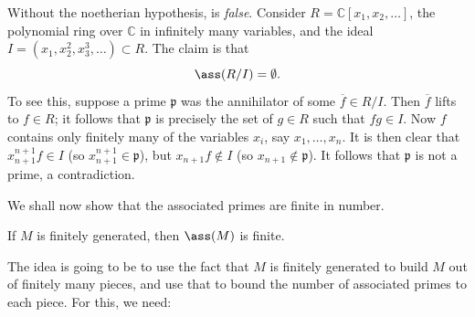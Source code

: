 \begin{example}
Without the noetherian hypothesis,  is
\emph{false}. Consider $R = \mathbb{C}[x_1, x_2, \dots]$, the polynomial ring
over $\mathbb{C}$ in infinitely many variables, and the ideal $I = (x_1,
x_2^2, x_3^3, \dots) \subset R$.
The claim is that 
\[ \ass(R/I ) = \emptyset.  \]
To see this, suppose a prime $\mathfrak{p}$ was the annihilator of some
$\overline{f}\in R/I$.  Then $\overline{f}$ lifts to $f \in R$; it follows
that $\mathfrak{p}$ is precisely the set of $g \in R$ such that $fg \in I$.
Now $f$ contains only finitely many of the variables $x_i$, say $x_1, \dots,
x_n$. It is then clear that $x_{n+1}^{n+1} f \in I$  (so $x_{n+1}^{n+1} \in
\mathfrak{p}$), but $x_{n+1} f \notin I$ (so $x_{n+1} \notin \mathfrak{p}$).
It follows that $\mathfrak{p}$ is not a prime, a contradiction.
\end{example} 

We shall now show that the associated primes are finite in number.

\begin{proposition} \label{finiteassm}
If $M$ is finitely generated, then $\ass(M)$ is finite.
\end{proposition}

The idea is going to be to use the fact that $M$ is finitely generated to build
$M$ out of finitely many pieces, and use that to bound the number of associated
primes to each piece. For this, we need:

